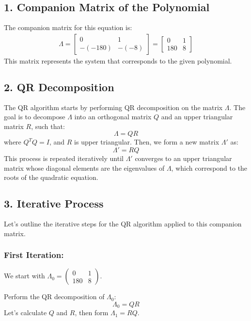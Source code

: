 \documentclass[journal]{IEEEtran}
\begin{document}
\subsection*{1. Companion Matrix of the Polynomial}
The companion matrix for this equation is:
\begin{align}
    \Lambda =
    \begin{bmatrix}
        0 & 1 \\
        -(-180) & -(-8)
    \end{bmatrix}
    =
    \begin{bmatrix}
        0 & 1 \\
        180 & 8
    \end{bmatrix}
\end{align}
This matrix represents the system that corresponds to the given polynomial.

\subsection*{2. QR Decomposition}
The QR algorithm starts by performing QR decomposition on the matrix \( \Lambda \). The goal is to decompose \( \Lambda \) into an orthogonal matrix \( Q \) and an upper triangular matrix \( R \), such that:
\[
\Lambda = QR
\]
where \( Q^T Q = I \), and \( R \) is upper triangular. Then, we form a new matrix \( \Lambda' \) as:
\[
\Lambda' = RQ
\]
This process is repeated iteratively until \( \Lambda' \) converges to an upper triangular matrix whose diagonal elements are the eigenvalues of \( \Lambda \), which correspond to the roots of the quadratic equation.

\subsection*{3. Iterative Process}
Let’s outline the iterative steps for the QR algorithm applied to this companion matrix.

\subsubsection*{First Iteration:}
We start with \( \Lambda_0 = \begin{pmatrix} 0 & 1 \\ 180 & 8 \end{pmatrix} \).

Perform the QR decomposition of \( \Lambda_0 \):
\[
\Lambda_0 = QR
\]
Let’s calculate \( Q \) and \( R \), then form \( \Lambda_1 = RQ \).
\end{document}
